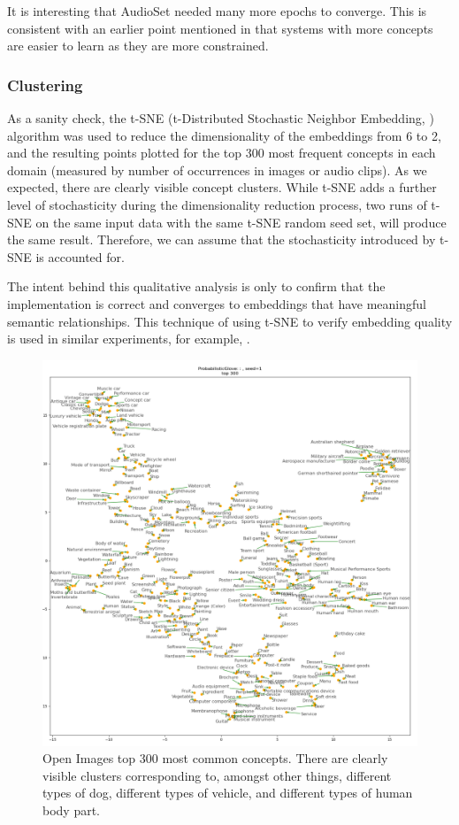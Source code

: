 It is interesting that AudioSet needed many more epochs to converge. This is consistent with an earlier point mentioned in \cite{GOLDSTONE2002295} that systems with more concepts are easier to learn as they are more constrained. 

\newpage
\subsubsection{Clustering}
As a sanity check, the t-SNE (t-Distributed Stochastic Neighbor Embedding, \cite{tsne}) algorithm was  used to reduce the dimensionality of the embeddings from 6 to 2, and the resulting points plotted for the top 300 most frequent concepts in each domain (measured by number of occurrences in images or audio clips). As we expected, there are clearly visible concept clusters.  While t-SNE adds a further level of stochasticity during the dimensionality reduction process, two runs of t-SNE on the same input data with the same t-SNE random seed set, will produce the same result. Therefore, we can assume that the stochasticity introduced by t-SNE is accounted for. 

The intent behind this qualitative analysis is only to confirm that the implementation is correct and converges to embeddings that have meaningful semantic relationships. This technique of using t-SNE to verify embedding quality is used in similar experiments, for example, \cite{CoocurrenceVisionLanguage2021}. 

\begin{figure}[H]
\label{fig:gloveclusters}
    \centering
    \includegraphics[width=\textwidth]{images/method/probabilistic_independent/top300_tsne_openimages__ProbabilisticGlove_1.png}
    \caption{
        Open Images top 300 most common concepts. There are clearly visible clusters corresponding to, amongst other things, different types of dog, different types of vehicle, and different types of human body part.
    }
\end{figure}

